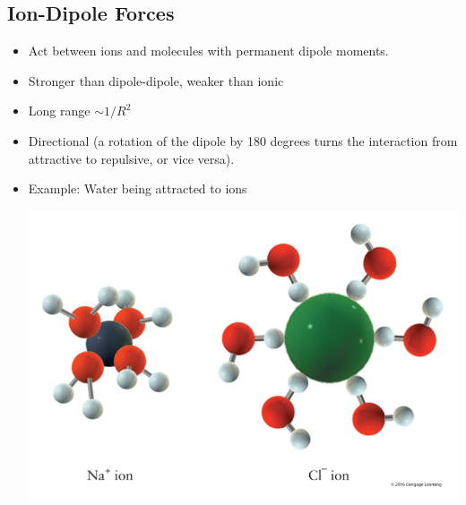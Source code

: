 \documentclass[10pt]{article}
\begin{document}
\subsection*{Ion-Dipole Forces}
\begin{itemize}
    \item Act between ions and molecules with permanent dipole moments.
    \item Stronger than dipole-dipole, weaker than ionic
    \item Long range $\sim 1/R^2$
    \item Directional (a rotation of the dipole by 180 degrees turns the interaction from attractive to repulsive, or vice versa).
    \item Example: Water being attracted to ions
    \begin{center}
        \includegraphics[scale=0.5]{W2_5.png}
    \end{center}
\end{itemize}
\end{document}

